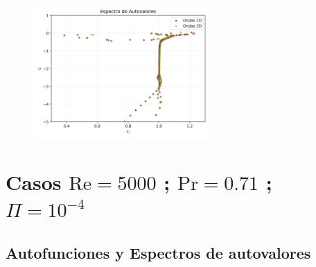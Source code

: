\begin{figure}[H]
  \centering  

  \caption{}
  \label{fig:eigenfuns4-Re5000-Pr0071}
\end{figure}

\begin{figure}[H]
  \centering
    \includegraphics[width=0.6\textwidth]{figures/cap6/Re5000-Pr071-Ri1Em6/Re5000-Pr071-Ri1Em6_eigenvals.png}
  \caption{}
  \label{fig:spectra-Re5000-Pr0071}
\end{figure}


\newpage

\section{Casos $\text{Re}=5000$ ; $\text{Pr}=0.71$ ; $\Pi=10^{-4}$}

\subsection{Autofunciones y Espectros de autovalores}

\begin{figure}[H]
  \centering
  \caption{}
  \label{fig:eigenfuns1-Re5000-Pr0071}
\end{figure}

